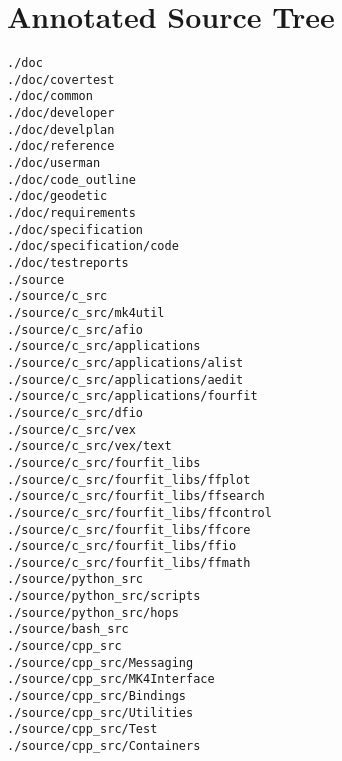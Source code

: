 %
%
%

\section{Annotated Source Tree}
\label{sec:srctree}


\tiny
\begin{verbatim}
./doc
./doc/covertest
./doc/common
./doc/developer
./doc/develplan
./doc/reference
./doc/userman
./doc/code_outline
./doc/geodetic
./doc/requirements
./doc/specification
./doc/specification/code
./doc/testreports
./source
./source/c_src
./source/c_src/mk4util
./source/c_src/afio
./source/c_src/applications
./source/c_src/applications/alist
./source/c_src/applications/aedit
./source/c_src/applications/fourfit
./source/c_src/dfio
./source/c_src/vex
./source/c_src/vex/text
./source/c_src/fourfit_libs
./source/c_src/fourfit_libs/ffplot
./source/c_src/fourfit_libs/ffsearch
./source/c_src/fourfit_libs/ffcontrol
./source/c_src/fourfit_libs/ffcore
./source/c_src/fourfit_libs/ffio
./source/c_src/fourfit_libs/ffmath
./source/python_src
./source/python_src/scripts
./source/python_src/hops
./source/bash_src
./source/cpp_src
./source/cpp_src/Messaging
./source/cpp_src/MK4Interface
./source/cpp_src/Bindings
./source/cpp_src/Utilities
./source/cpp_src/Test
./source/cpp_src/Containers
\end{verbatim}

